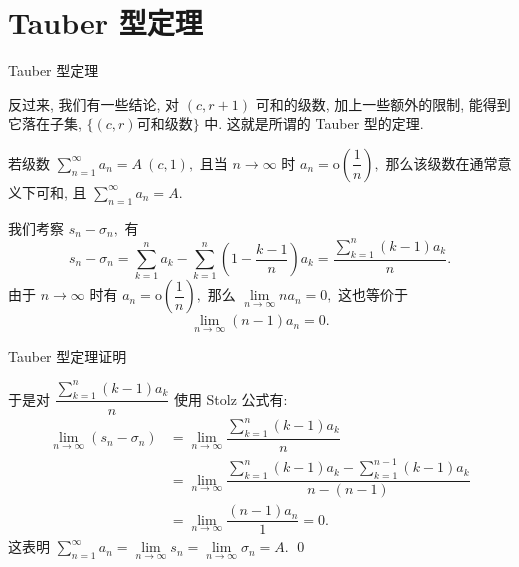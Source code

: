 
\section[Tauber 型定理]{Tauber 型定理}


\begin{frame}{Tauber 型定理}

反过来, 我们有一些结论, 对 $(c, r+1)$ 可和的级数, 加上一些额外的限制, 能得到它落在子集, $\{ (c, r) \text{可和级数} \}$ 中. 这就是所谓的 Tauber 型的定理.

\pause
\vspace*{0.5em}

\begin{thm}[Tauber]
若级数 $\sum\limits_{n=1}^{\infty} a_n = A~(c, 1),$ 且当 $n\to\infty$ 时 $a_n = \mathrm{o} \left( \dfrac{1}{n} \right),$ 那么该级数在通常意义下可和, 且 $\sum\limits_{n=1}^{\infty} a_n = A.$
\end{thm}

\pause
\vspace*{0.5em}

\startproof[bg=yellow, fg=red]
我们考察 $s_n - \sigma_n,$
\pause
有
\[
s_n - \sigma_n = \sum\limits_{k=1}^n a_k - \sum\limits_{k=1}^n \left( 1 - \dfrac{k-1}{n} \right) a_k = \dfrac{\sum\limits_{k=1}^n (k-1)a_k}{n}.
\]
\pause
由于 $n \to \infty$ 时有 $a_n = \mathrm{o}\left( \dfrac{1}{n} \right),$ 那么 $\lim\limits_{n \to \infty} n a_n = 0,$ 这也等价于
\[
\lim\limits_{n \to \infty} (n - 1) a_n = 0.
\]

\end{frame}


\begin{frame}{Tauber 型定理证明}

于是对 $\dfrac{\sum\limits_{k=1}^n (k-1)a_k}{n}$ 使用 Stolz 公式有:
\begin{align*}
\lim\limits_{n \to \infty} (s_n - \sigma_n) & = \lim\limits_{n \to \infty} \dfrac{\sum\limits_{k=1}^n (k-1)a_k}{n} \\
& = \lim\limits_{n \to \infty} \dfrac{\sum\limits_{k=1}^n (k-1)a_k - \sum\limits_{k=1}^{n-1} (k-1)a_k}{n - (n-1)} \\
& = \lim\limits_{n \to \infty} \dfrac{(n-1)a_n}{1} = 0.
\end{align*}
这表明 $\sum\limits_{n=1}^{\infty} a_n = \lim\limits_{n \to \infty} s_n = \lim\limits_{n \to \infty} \sigma_n = A.$
\qed

\end{frame}

